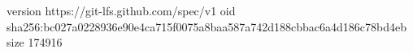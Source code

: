 version https://git-lfs.github.com/spec/v1
oid sha256:bc027a0228936e90e4ca715f0075a8baa587a742d188cbbac6a4d186c78bd4eb
size 174916

